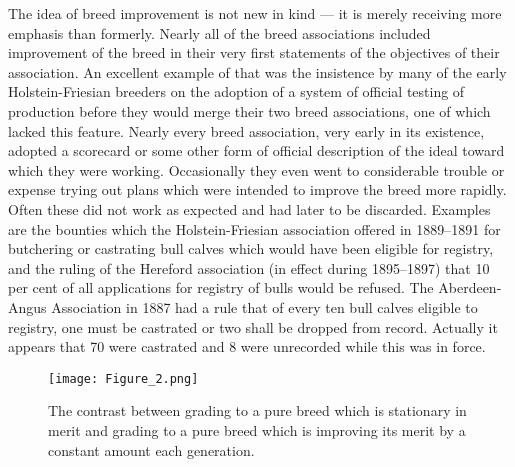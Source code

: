 The idea of breed improvement is not new in kind --- it is merely receiving more emphasis than formerly. Nearly all of the 
breed associations included improvement of the breed in their very first statements of the objectives of their association. 
An excellent example of that was the insistence by many of the early Holstein-Friesian breeders on the adoption of a system 
of official testing of production before they would merge their two breed associations, one of which lacked this feature.
Nearly every breed association, very early in its existence, adopted a scorecard or some other form of official description 
of the ideal toward which they were working. Occasionally they even went to considerable trouble or expense trying out 
plans which were intended to improve the breed more rapidly. Often these did not work as expected and had later to be 
discarded. Examples are the bounties which the Holstein-Friesian association offered in 1889--1891 for butchering or 
castrating bull calves which would have been eligible for registry, and the ruling of the Hereford association (in effect 
during 1895--1897) that 10 per cent of all applications for registry of bulls would be refused. The Aberdeen-Angus 
Association in 1887 had a rule that of every ten bull calves eligible to registry, one must be castrated or two shall be 
dropped from record. Actually it appears that 70 were castrated and 8 were unrecorded while this was in force.

\begin{figure}[htbp]
    \texttt{[image: Figure\_2.png]}
    \caption{The contrast between grading to a pure breed which is stationary in merit and grading to a pure breed which is improving its merit by a constant amount each generation.}
    \label{fig:Lush_Figure_2}
\end{figure}

